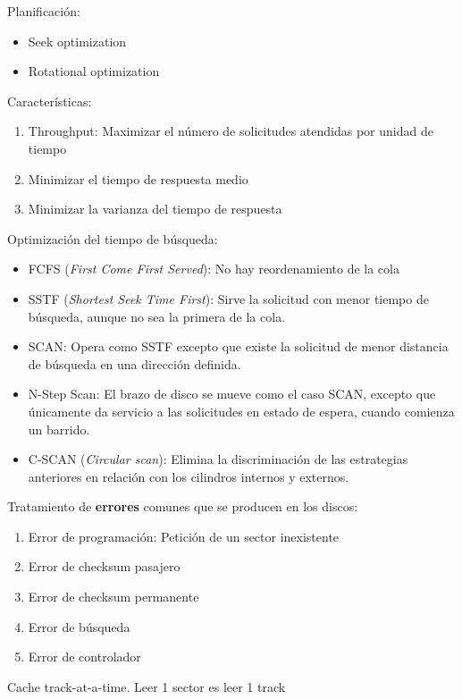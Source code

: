 \documentclass[10pt,portrait, twocolumn]{article}
\begin{document}
Planificación:
	
	\begin{itemize}
	\item Seek optimization
	\item Rotational optimization
	\end{itemize}
	
Características:
	\begin{enumerate}
	\item Throughput: Maximizar el número de solicitudes atendidas por unidad de tiempo
	\item Minimizar el tiempo de respuesta medio
	\item Minimizar la varianza del tiempo de respuesta
	\end{enumerate}
 
 Optimización del tiempo de búsqueda:
 
 	\begin{itemize}
	\item FCFS (\textit{First Come First Served}): No hay reordenamiento de la cola
	\item SSTF (\textit{Shortest Seek Time First}): Sirve la solicitud con menor tiempo de búsqueda, aunque no sea la primera de la cola.
	\item SCAN: Opera como SSTF excepto que existe la solicitud de menor distancia de búsqueda en una dirección definida.
	\item N-Step Scan: El brazo de disco se mueve como el caso SCAN, excepto que únicamente da servicio a las solicitudes en estado de espera, cuando comienza un barrido.
	\item C-SCAN (\textit{Circular scan}): Elimina la discriminación de las estrategias anteriores en relación con los cilindros internos y externos.
	\end{itemize}
	
Tratamiento de \textbf{errores} comunes que se producen en los discos:

	\begin{enumerate}
	\item Error de programación: Petición de un sector inexistente
	\item Error de checksum pasajero
	\item Error de checksum permanente
	\item Error de búsqueda
	\item Error de controlador
	\end{enumerate}
 
 Cache track-at-a-time. Leer 1 sector es leer 1 track
 
\end{document}
